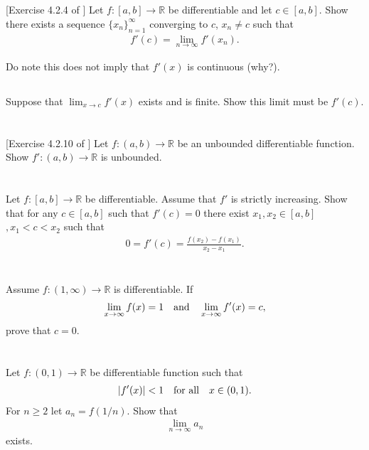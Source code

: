 \documentclass[11pt,letterpaper]{article}
\begin{document}
\section{}

\subsection{} [Exercise 4.2.4 of \cite{Lebl_23}] 
Let $f:[a,b]\to\mathbb{R}$ be differentiable and let $c\in[a,b]$. Show there exists a sequence $\{x_n\}^\infty_{n=1}$ converging to $c$, $x_n\neq c$ such that
\begin{align}
    f'(c) = \lim_{n\to\infty} f'(x_n).
\end{align}

Do note this does not imply that $f'(x)$ is continuous (why?).

\subsection{} 
Suppose that $\lim_{x\to c} f'(x)$ exists and is finite. Show this limit must be $f'(c)$.

\section{} [Exercise 4.2.10 of \cite{Lebl_23}] 
Let $f:(a,b)\to\mathbb{R}$ be an unbounded differentiable function. Show $f':(a,b)\to\mathbb{R}$ is unbounded.

\section{}
Let $f:[a,b]\to\mathbb{R}$ be differentiable. Assume that $f'$ is strictly increasing. Show that for any $c\in [a,b]$ such that $f'(c)=0$ there exist $x_1,x_2\in[a,b]$$, x_1<c<x_2$ such that
\begin{align}
    0 = f'(c) = \frac{f(x_2)-f(x_1)}{x_2-x_1}.
\end{align}

\section{}
Assume $f:(1,\infty)\to\mathbb{R}$ is differentiable. If
\begin{align}
    \lim_{x\to\infty} f(x)=1 \quad \mbox{and} \quad \lim_{x\to\infty} f'(x)=c,
\end{align}
prove that $c=0$.

\section{}
Let $f:(0,1)\to\mathbb{R}$ be differentiable function such that
\begin{align}
    |f'(x)|<1 \quad \mbox{for all} \quad x\in(0,1).
\end{align}
For $n\geq 2$ let $a_n = f(1/n)$. Show that
\begin{align}
    \lim_{n\to\infty} a_n
\end{align}
exists.
\end{document}
